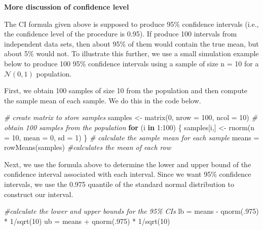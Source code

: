 \documentclass[
]{book}
\newenvironment{Shaded}{\begin{snugshade}}{\end{snugshade}}
\newcommand{\AttributeTok}[1]{\textcolor[rgb]{0.77,0.63,0.00}{#1}}
\newcommand{\CommentTok}[1]{\textcolor[rgb]{0.56,0.35,0.01}{\textit{#1}}}
\newcommand{\ControlFlowTok}[1]{\textcolor[rgb]{0.13,0.29,0.53}{\textbf{#1}}}
\newcommand{\DecValTok}[1]{\textcolor[rgb]{0.00,0.00,0.81}{#1}}
\newcommand{\FunctionTok}[1]{\textcolor[rgb]{0.00,0.00,0.00}{#1}}
\newcommand{\NormalTok}[1]{#1}
\newcommand{\OtherTok}[1]{\textcolor[rgb]{0.56,0.35,0.01}{#1}}
\newcommand{\SpecialCharTok}[1]{\textcolor[rgb]{0.00,0.00,0.00}{#1}}
\theoremstyle{definition}
\theoremstyle{definition}
\theoremstyle{definition}
\theoremstyle{definition}
\theoremstyle{remark}
\begin{document}
\textbf{More discussion of confidence level}

The CI formula given above is supposed to produce 95\% confidence intervals (i.e., the confidence level of the procedure is 0.95). If produce 100 intervals from independent data sets, then about 95\% of them would contain the true mean, but about 5\% would not. To illustrate this further, we use a small simulation example below to produce 100 95\% confidence intervals using a sample of size n = 10 for a \(\mathcal{N(0,1)}\) population.

First, we obtain 100 samples of size 10 from the population and then compute the sample mean of each sample. We do this in the code below.

\begin{Shaded}
\begin{Highlighting}[]
\CommentTok{\# create matrix to store samples}
\NormalTok{samples }\OtherTok{\textless{}{-}} \FunctionTok{matrix}\NormalTok{(}\DecValTok{0}\NormalTok{, }\AttributeTok{nrow =} \DecValTok{100}\NormalTok{, }\AttributeTok{ncol =} \DecValTok{10}\NormalTok{)}
\CommentTok{\# obtain 100 samples from the population}
\ControlFlowTok{for}\NormalTok{ (i }\ControlFlowTok{in} \DecValTok{1}\SpecialCharTok{:}\DecValTok{100}\NormalTok{) \{}
\NormalTok{  samples[i,] }\OtherTok{\textless{}{-}} \FunctionTok{rnorm}\NormalTok{(}\AttributeTok{n =} \DecValTok{10}\NormalTok{, }\AttributeTok{mean =} \DecValTok{0}\NormalTok{, }\AttributeTok{sd =} \DecValTok{1}\NormalTok{)}
\NormalTok{\}}
\CommentTok{\# calculate the sample mean for each sample}
\NormalTok{means }\OtherTok{=} \FunctionTok{rowMeans}\NormalTok{(samples) }\CommentTok{\#calculates the mean of each row}
\end{Highlighting}
\end{Shaded}

Next, we use the formula above to determine the lower and upper bound of the confidence interval associated with each interval. Since we want 95\% confidence intervals, we use the 0.975 quantile of the standard normal distribution to construct our interval.

\begin{Shaded}
\begin{Highlighting}[]
\CommentTok{\#calculate the lower and upper bounds for the 95\% CIs}
\NormalTok{lb }\OtherTok{=}\NormalTok{ means }\SpecialCharTok{{-}} \FunctionTok{qnorm}\NormalTok{(.}\DecValTok{975}\NormalTok{) }\SpecialCharTok{*} \DecValTok{1}\SpecialCharTok{/}\FunctionTok{sqrt}\NormalTok{(}\DecValTok{10}\NormalTok{)}
\NormalTok{ub }\OtherTok{=}\NormalTok{ means }\SpecialCharTok{+} \FunctionTok{qnorm}\NormalTok{(.}\DecValTok{975}\NormalTok{) }\SpecialCharTok{*} \DecValTok{1}\SpecialCharTok{/}\FunctionTok{sqrt}\NormalTok{(}\DecValTok{10}\NormalTok{)}
\end{Highlighting}
\end{Shaded}
\end{document}
